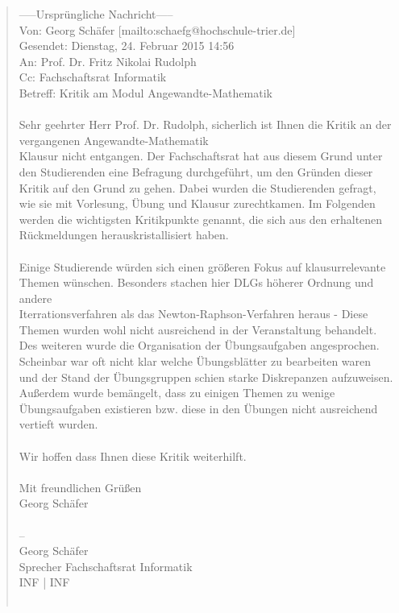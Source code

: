 \documentclass[a4paper, 11pt]{article} %
\begin{document}
\begin{quote}
-----Ursprüngliche Nachricht----- \\
Von: Georg Schäfer [mailto:schaefg@hochschule-trier.de] \\
Gesendet: Dienstag, 24. Februar 2015 14:56 \\
An: Prof. Dr. Fritz Nikolai Rudolph \\
Cc: Fachschaftsrat Informatik \\
Betreff: Kritik am Modul Angewandte-Mathematik \\
\\
Sehr geehrter Herr Prof. Dr. Rudolph, 
\newline
\newline
sicherlich ist Ihnen die Kritik an der vergangenen Angewandte-Mathematik  \\
Klausur nicht entgangen. Der Fachschaftsrat hat aus diesem Grund unter \\
den Studierenden eine Befragung durchgeführt, um den Gründen dieser \\
Kritik auf den Grund zu gehen. Dabei wurden die Studierenden gefragt, \\
wie sie mit Vorlesung, Übung und Klausur zurechtkamen. Im Folgenden \\
werden die wichtigsten Kritikpunkte genannt, die sich aus den erhaltenen \\
Rückmeldungen herauskristallisiert haben. \\
\\
Einige Studierende würden sich einen größeren Fokus auf klausurrelevante \\
Themen wünschen. Besonders stachen hier DLGs höherer Ordnung und andere \\
Iterrationsverfahren als das Newton-Raphson-Verfahren heraus - Diese \\
Themen wurden wohl nicht ausreichend in der Veranstaltung behandelt. \\
Des weiteren wurde die Organisation der Übungsaufgaben angesprochen. \\
Scheinbar war oft nicht klar welche Übungsblätter zu bearbeiten waren \\
und der Stand der Übungsgruppen schien starke Diskrepanzen aufzuweisen. \\
Außerdem wurde bemängelt, dass zu einigen Themen zu wenige \\
Übungsaufgaben existieren bzw. diese in den Übungen nicht ausreichend \\
vertieft wurden. \\
\\
Wir hoffen dass Ihnen diese Kritik weiterhilft. \\
\\
Mit freundlichen Grüßen \\
Georg Schäfer \\
\\
-- \\ 
Georg Schäfer \\
Sprecher Fachschaftsrat Informatik \\
INF | INF \\
\\
\end{quote}
\end{document}
